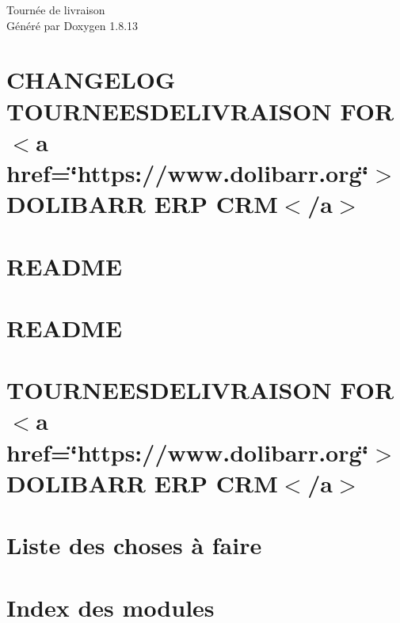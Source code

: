 \documentclass[twoside]{book}
\newcommand{\+}{\discretionary{\mbox{\scriptsize$\hookleftarrow$}}{}{}}
\newcommand{\clearemptydoublepage}{%
  \newpage{\pagestyle{empty}\cleardoublepage}%
}
\begin{document}
\hypersetup{pageanchor=false,
             bookmarksnumbered=true,
             pdfencoding=unicode
            }
\begin{titlepage}
\vspace*{7cm}
\begin{center}%
{\Large Tournée de livraison }\\
\vspace*{1cm}
{\large Généré par Doxygen 1.8.13}\\
\end{center}
\end{titlepage}
\clearemptydoublepage
{}
\tableofcontents
\clearemptydoublepage
{}
\hypersetup{pageanchor=true}

\chapter{C\+H\+A\+N\+G\+E\+L\+OG T\+O\+U\+R\+N\+E\+E\+S\+D\+E\+L\+I\+V\+R\+A\+I\+S\+ON F\+OR $<$a href=\char`\"{}https\+://www.\+dolibarr.\+org\char`\"{}$>$D\+O\+L\+I\+B\+A\+RR E\+RP C\+RM$<$/a$>$}
\label{md_ChangeLog}

\chapter{R\+E\+A\+D\+ME}
\label{md_core_boxes_README}

\chapter{R\+E\+A\+D\+ME}
\label{md_core_triggers_README}

\chapter{T\+O\+U\+R\+N\+E\+E\+S\+D\+E\+L\+I\+V\+R\+A\+I\+S\+ON F\+OR $<$a href=\char`\"{}https\+://www.\+dolibarr.\+org\char`\"{}$>$D\+O\+L\+I\+B\+A\+RR E\+RP C\+RM$<$/a$>$}
\label{md_README}

\chapter{Liste des choses à faire}
\label{todo}

\chapter{Index des modules}

\end{document}
